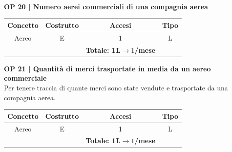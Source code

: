 \vspace{.6cm}


\textbf{\small OP 20 | Numero aerei commerciali di una compagnia aerea}\\

\begin{tabular}{ c c c c}
	\hline
	\rowcolor{airforceblue}
	\textbf{\color{white}Concetto} & \textbf{\color{white}Costrutto} & \textbf{\color{white}Accesi} & \textbf{\color{white}Tipo}\\
	\hline
	\textsf{\small Aereo} & \textsf{\small E} & \textsf{\small 1} &  \textsf{\small L}\\
	\hline
	\rowcolor{airforceblue}
	\textsf{\small } & \textsf{\small } & \textbf{\color{white}Totale: 1L$\rightarrow 1$/mese } \textsf{\small } & \textsf{\small }\\
	\hline
\end{tabular}

\vspace{.6cm}


\textbf{\small OP 21 | Quantità di merci trasportate in media da un aereo commerciale}\\

\textsf{\small Per tenere traccia di quante merci sono state vendute e trasportate da una compagnia aerea.}\break

\begin{tabular}{ c c c c}
	\hline
	\rowcolor{airforceblue}
	\textbf{\color{white}Concetto} & \textbf{\color{white}Costrutto} & \textbf{\color{white}Accesi} & \textbf{\color{white}Tipo}\\
	\hline
	\textsf{\small Aereo} & \textsf{\small E} & \textsf{\small 1} &  \textsf{\small L}\\
	\hline
	\rowcolor{airforceblue}
	\textsf{\small } & \textsf{\small } & \textbf{\color{white}Totale: 1L$\rightarrow 1$/mese } \textsf{\small } & \textsf{\small }\\
	\hline
\end{tabular}




